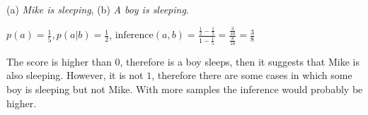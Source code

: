 \documentclass{article}
\begin{document}
\section{}

(a) \textit{Mike is sleeping}, (b) \textit{A boy is sleeping}.

\bigskip

$p(a) = \frac{1}{5}, p(a|b) = \frac{1}{2}$, 
$\text{inference}(a,b) = \frac{\frac{1}{2}-\frac{1}{5}}{1-\frac{1}{5}} = \frac{\frac{3}{10}}{\frac{8}{10}} = \frac{3}{8}$

\bigskip

The score is higher than $0$, therefore is a boy sleeps, then it suggests that Mike is also sleeping. However, it is not $1$, therefore there are some cases in which some boy is sleeping but not Mike. With more samples the inference would probably be higher.
\end{document}

